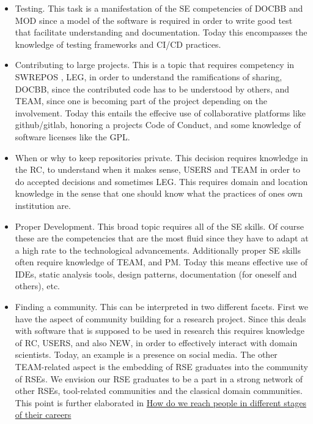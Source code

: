 \documentclass[a4paper
]{article}
\providecommand{\tightlist}{%
  \setlength{\itemsep}{0pt}\setlength{\parskip}{0pt}}
\begin{document}
\begin{itemize}
\tightlist
\item
  Testing. This task is a manifestation of the SE competencies of DOCBB
  and MOD since a model of the software is required in order to write
  good test that facilitate understanding and documentation. Today this
  encompasses the knowledge of testing frameworks and CI/CD practices.
\item
  Contributing to large projects. This is a topic that requires
  competency in SWREPOS , LEG, in order to understand the ramifications
  of sharing, DOCBB, since the contributed code has to be understood by
  others, and TEAM, since one is becoming part of the project depending
  on the involvement. Today this entails the effecive use of
  collaborative platforms like github/gitlab, honoring a projects Code
  of Conduct, and some knowledge of software licenses like the GPL.
\item
  When or why to keep repositories private. This decision requires
  knowledge in the RC, to understand when it makes sense, USERS and TEAM
  in order to do accepted decisions and sometimes LEG. This requires
  domain and location knowledge in the sense that one should know what
  the practices of ones own institution are.
\item
  Proper Development. This broad topic requires all of the SE skills. Of
  course these are the competencies that are the most fluid since they
  have to adapt at a high rate to the technological advancements.
  Additionally proper SE skills often require knowledge of TEAM, and PM.
  Today this means effective use of IDEs, static analysis tools, design
  patterns, documentation (for oneself and others), etc.
\item
  Finding a community. This can be interpreted in two different facets.
  First we have the aspect of community building for a research project.
  Since this deals with software that is supposed to be used in research
  this requires knowledge of RC, USERS, and also NEW, in order to
  effectively interact with domain scientists. Today, an example is a
  presence on social media. The other TEAM-related aspect is the
  embedding of RSE graduates into the community of RSEs. We envision our
  RSE graduates to be a part in a strong network of other RSEs,
  tool-related communities and the classical domain communities. This
  point is further elaborated in
  \protect\hyperlink{how-do-we-reach-people-in-different-stages-of-their-careers}{How
  do we reach people in different stages of their careers}
\end{itemize}
\end{document}
